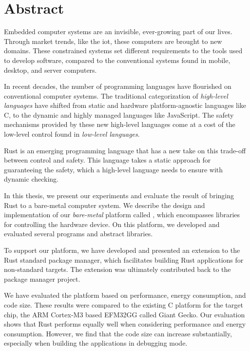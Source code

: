 
\chapter{Abstract}
\label{chap:abstract}

Embedded computer systems are an invisible, ever-growing part of our lives.
Through market trends, like the \glsdesc{iot}, these computers are brought to new domains.
These constrained systems set different requirements to the tools used to develop software, compared to the conventional systems found in mobile, desktop, and server computers.

In recent decades, the number of programming languages have flourished on conventional computer systems.
The traditional categorization of \emph{high-level languages} have shifted from static and hardware platform-agnostic languages like C, to the dynamic and highly managed languages like JavaScript.
The safety mechanisms provided by these new high-level languages come at a cost of the low-level control found in \emph{low-level languages}.

Rust is an emerging programming language that has a new take on this trade-off between control and safety.
This language takes a static approach for guaranteeing the safety, which a high-level language needs to ensure with dynamic checking.

In this thesis, we present our experiments and evaluate the result of bringing Rust to a bare-metal computer system.
We describe the design and implementation of our \emph{bare-metal} platform called {\rg}, which encompasses libraries for controlling the hardware device.
On this platform, we developed and evaluated several programs and abstract libraries.

To support our platform, we have developed and presented an extension to the Rust standard package manager, which facilitates building Rust applications for non-standard targets.
The extension was ultimately contributed back to the package manager project.

We have evaluated the platform based on performance, energy consumption, and code size.
These results were compared to the existing C platform for the target chip, the ARM Cortex-M3 based EFM32GG called Giant Gecko.
Our evaluation shows that Rust performs equally well when considering performance and energy consumption.
However, we find that the code size can increase substantially, especially when building the applications in debugging mode.
